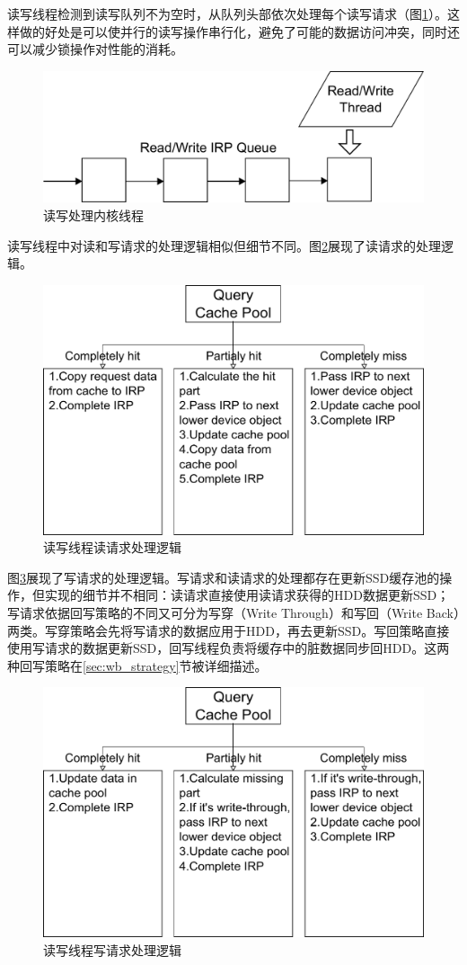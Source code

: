\begin{enumerate}
读写线程检测到读写队列不为空时，从队列头部依次处理每个读写请求（图\ref{fig:df-rw-thread}）。这样做的好处是可以使并行的读写操作串行化，避免了可能的数据访问冲突，同时还可以减少锁操作对性能的消耗。

\begin{figure}[H]
\centering
\includegraphics[width=0.5\linewidth]{./graph/df-rw-thread}
\caption{读写处理内核线程}
\label{fig:df-rw-thread}
\end{figure}

读写线程中对读和写请求的处理逻辑相似但细节不同。图\ref{fig:df-proc-read}展现了读请求的处理逻辑。

\begin{figure}[H]
\centering
\includegraphics[width=0.75\linewidth]{./graph/df-proc-read}
\caption{读写线程读请求处理逻辑}
\label{fig:df-proc-read}
\end{figure}

图\ref{fig:df-proc-write}展现了写请求的处理逻辑。写请求和读请求的处理都存在更新SSD缓存池的操作，但实现的细节并不相同：读请求直接使用读请求获得的HDD数据更新SSD；写请求依据回写策略的不同又可分为写穿（Write Through）和写回（Write Back）两类。写穿策略会先将写请求的数据应用于HDD，再去更新SSD。写回策略直接使用写请求的数据更新SSD，回写线程负责将缓存中的脏数据同步回HDD。这两种回写策略在\ref{sec:wb_strategy}节被详细描述。

\begin{figure}[H]
\centering
\includegraphics[width=0.75\linewidth]{./graph/df-proc-write}
\caption{读写线程写请求处理逻辑}
\label{fig:df-proc-write}
\end{figure}

\end{enumerate}

